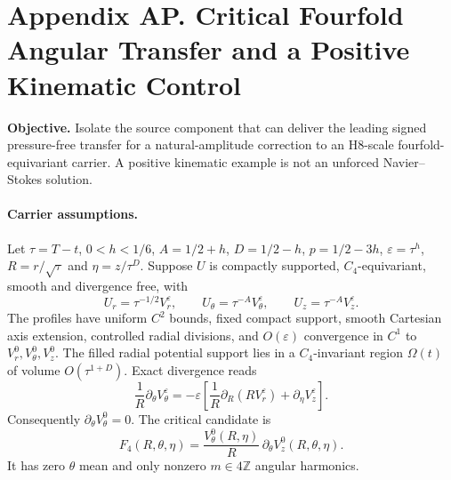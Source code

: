 \clearpage
\section*{Appendix AP. Critical Fourfold Angular Transfer and a Positive Kinematic Control}
\noindent\textbf{Objective.} Isolate the source component that can deliver the leading signed pressure-free transfer for a natural-amplitude correction to an H8-scale fourfold-equivariant carrier. A positive kinematic example is not an unforced Navier--Stokes solution.

\paragraph{Carrier assumptions.}
Let $\tau=T-t$, $0<h<1/6$, $A=1/2+h$, $D=1/2-h$, $p=1/2-3h$, $\varepsilon=\tau^h$, $R=r/\sqrt\tau$ and $\eta=z/\tau^D$. Suppose $U$ is compactly supported, $C_4$-equivariant, smooth and divergence free, with
\[
U_r=\tau^{-1/2}V_r^\varepsilon,\qquad
U_\theta=\tau^{-A}V_\theta^\varepsilon,\qquad
U_z=\tau^{-A}V_z^\varepsilon.
\]
The profiles have uniform $C^2$ bounds, fixed compact support, smooth Cartesian axis extension, controlled radial divisions, and $O(\varepsilon)$ convergence in $C^1$ to $V_r^0,V_\theta^0,V_z^0$. The filled radial potential support lies in a $C_4$-invariant region $\Omega(t)$ of volume $O(\tau^{1+D})$. Exact divergence reads
\[
\frac1R\partial_\theta V_\theta^\varepsilon
=-\varepsilon\left[\frac1R\partial_R(RV_r^\varepsilon)+\partial_\eta V_z^\varepsilon\right].
\]
Consequently $\partial_\theta V_\theta^0=0$. The critical candidate is
\[
\boxed{F_4(R,\theta,\eta)=\frac{V_\theta^0(R,\eta)}R\,
\partial_\theta V_z^0(R,\theta,\eta).}
\]
It has zero $\theta$ mean and only nonzero $m\in4\mathbb Z$ angular harmonics.


